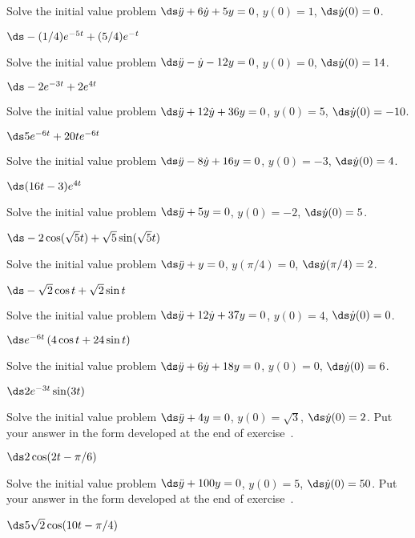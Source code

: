 \begin{exercises}
\exercise Solve the initial value problem 
$\ds \ddot y+6\dot y +5y=0$,
$y(0)=1$, $\ds\dot y(0)=0$.
\begin{answer} $\ds -(1/4)e^{-5t}+(5/4)e^{-t}$
\end{answer}
\exercise Solve the initial value problem 
$\ds\ddot y-\dot y-12y=0$,
$y(0)=0$, $\ds\dot y(0)=14$.
\begin{answer} $\ds-2e^{-3t}+2e^{4t}$
\end{answer}
\exercise Solve the initial value problem 
$\ds\ddot y+12\dot y+36y=0$,
$y(0)=5$, $\ds\dot y(0)=-10$.
\begin{answer} $\ds 5e^{-6t}+20te^{-6t}$
\end{answer}
\exercise Solve the initial value problem 
$\ds\ddot y-8\dot y+16y=0$,
$y(0)=-3$, $\ds\dot y(0)=4$.
\begin{answer} $\ds (16t-3)e^{4t}$
\end{answer}
\exercise Solve the initial value problem 
$\ds\ddot y+5y=0$,
$y(0)=-2$, $\ds\dot y(0)=5$.
\begin{answer} $\ds -2\cos(\sqrt5t)+\sqrt{5}\sin(\sqrt{5}t)$
\end{answer}
\exercise Solve the initial value problem 
$\ds\ddot y+y=0$,
$y(\pi/4)=0$, $\ds\dot y(\pi/4)=2$.
\begin{answer} $\ds -\sqrt2\cos t+\sqrt2\sin t$
\end{answer}
\exercise Solve the initial value problem 
$\ds\ddot y+12\dot y+37y=0$,
$y(0)=4$, $\ds\dot y(0)=0$.
\begin{answer} $\ds e^{-6t}\left(4\cos t+24\sin t\right)$
\end{answer}
\exercise Solve the initial value problem 
$\ds\ddot y+6\dot y+18y=0$,
$y(0)=0$, $\ds\dot y(0)=6$.
\begin{answer} $\ds 2e^{-3t}\sin(3t)$
\end{answer}
\exercise Solve the initial value problem 
$\ds\ddot y+4y=0$,
$y(0)=\sqrt3$, $\ds\dot y(0)=2$. Put your answer in the form developed
at the end of exercise~.
\begin{answer} $\ds 2\cos(2t-\pi/6)$
\end{answer}
\exercise Solve the initial value problem 
$\ds\ddot y+100y=0$,
$y(0)=5$, $\ds\dot y(0)=50$. Put your answer in the form developed
at the end of exercise~.
\begin{answer} $\ds 5\sqrt2\cos(10t-\pi/4)$
\end{answer}

\end{exercises}
